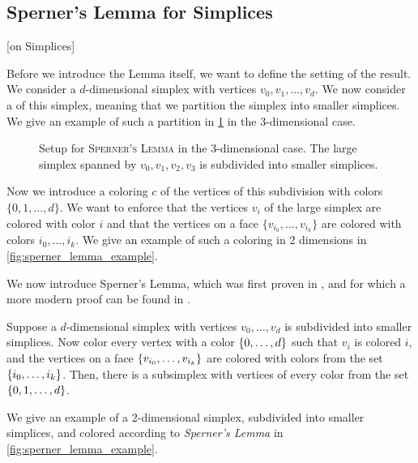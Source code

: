 \subsection{Sperner's Lemma for Simplices}[on Simplices]

Before we introduce the Lemma itself, we want to define the setting of the result. We consider a $d$-dimensional simplex with vertices $v_0, v_1, \dots, v_d$. We now consider a  of this simplex, meaning that we partition the simplex into smaller simplices. We give an example of such a partition in \cref{fig:sperner_setup_example} in the 3-dimensional case.

\begin{figure}[ht]
	\centering
	\caption[Setup for \textsc{Sperner's Lemma}]{Setup for \textsc{Sperner's Lemma} in the 3-dimensional case. The large simplex spanned by $v_0, v_1, v_2, v_3$ is subdivided into smaller simplices.}
	\label{fig:sperner_setup_example}
\end{figure}

Now we introduce a coloring $c$ of the vertices of this subdivision with colors $\{0, 1, \dots, d\}$. We want to enforce that the vertices $v_i$ of the large simplex are colored with color $i$ and that the vertices on a face $\{v_{i_0}, \dots, v_{i_k}\}$ are colored with colors $i_0, \dots, i_k$. We give an example of such a coloring in 2 dimensions in \cref{fig:sperner_lemma_example}.

We now introduce Sperner's Lemma, which was first proven in , and for which a more modern proof can be found in .
\begin{theorem}
	Suppose a $d$-dimensional simplex with vertices $v_0, \dots, v_d$ is subdivided into smaller simplices. Now color every vertex with a color $\left\{0, \dots, d\right\}$ such that $v_i$ is colored $i$, and the vertices on a face $\left\{v_{i_0}, \dots, v_{i_k}\right\}$ are colored with colors from the set $\left\{i_0, \dots, i_k\right\}$. Then, there is a subsimplex with vertices of every color from the set $\left\{0, 1, \dots, d\right\}$.
\end{theorem}

We give an example of a 2-dimensional simplex, subdivided into smaller simplices, and colored according to \textit{Sperner's Lemma} in \cref{fig:sperner_lemma_example}.

